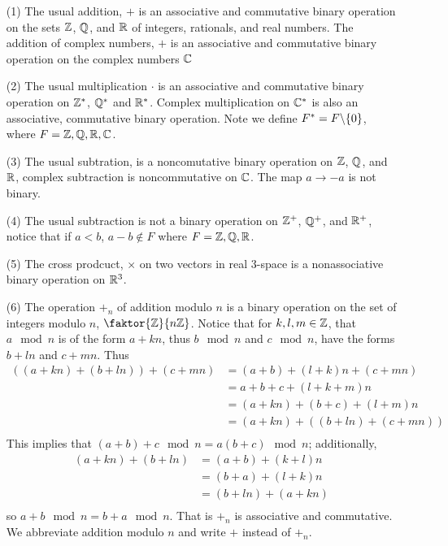 \begin{example}\label{example_1.1}
  \begin{enumerate}
    \item[(1)] The usual addition, $+$ is an associative and commutative binary
      operation on the sets $\mathbb{Z}$,  $\mathbb{Q}$, and  $\mathbb{R}$ of integers, rationals,
      and real numbers. The addition of complex numbers, $+$ is an
      associative and commutative binary operation on the complex numbers
      $\mathbb{C}$

    \item[(2)] The usual multiplication $\cdot$ is an associative and
      commutative binary operation on  $\mathbb{Z}^*$,  $\mathbb{Q}^*$ and  $\mathbb{R}^*$.
      Complex multiplication on  $\mathbb{C}^*$ is also an associative,
      commutative binary operation. Note we define
      $F^*={F} \backslash \{0\}$, where $F=\mathbb{Z},\mathbb{Q},\mathbb{R},\mathbb{C}$.

    \item[(3)] The usual subtration, is a noncomutative binary operation on
      $\mathbb{Z}$,  $\mathbb{Q}$, and  $\mathbb{R}$, complex subtraction is noncommutative on
      $\mathbb{C}$. The map $a \rightarrow -a$ is not binary.

    \item[(4)] The usual subtraction is not a binary operation on $\mathbb{Z}^+$,
      $\mathbb{Q}^+$, and  $\mathbb{R}^+$, notice that if  $a<b$,  $a-b \notin F$ where
      $F=\mathbb{Z},\mathbb{Q},\mathbb{R}$.

    \item[(5)] The cross prodcuct, $\times$ on two vectors in real $3$-space
      is a nonassociative binary operation on $\mathbb{R}^3$.

    \item[(6)] The operation $+_n$ of addition modulo $n$ is a binary
      operation on the set of integers modulo $n$, $\faktor{\Z}{n\Z}$.
      Notice that for $k, l, m \in \mathbb{Z}$, that $a \mod{n}$ is of the form
      $a+kn$, thus $b \mod{n}$ and $c \mod{n}$, have the forms $b+ln$ and
      $c+mn$. Thus
      \begin{align*}
        ((a+kn)+(b+ln))+(c+mn) &= (a+b)+(l+k)n+(c+mn) \\
                            &= a+b+c+(l+k+m)n \\
                            &=(a+kn)+(b+c)+(l+m)n \\
                            &=(a+kn)+((b+ln)+(c+mn)) \\
      \end{align*}
      This implies that $(a+b)+c \mod{n}=a(b+c) \mod{n}$; additionally,
      \begin{align*}
        (a+kn)+(b+ln) &= (a+b)+(k+l)n \\
                      &=(b+a)+(l+k)n  \\
                      &=(b+ln)+(a+kn) \\
      \end{align*}
      so $a+b \mod{n} = b+a \mod{n}$. That is $+_n$ is associative and
      commutative. We abbreviate addition modulo $n$ and write $+$ instead
      of  $+_n$.


\end{enumerate}
\end{example}
